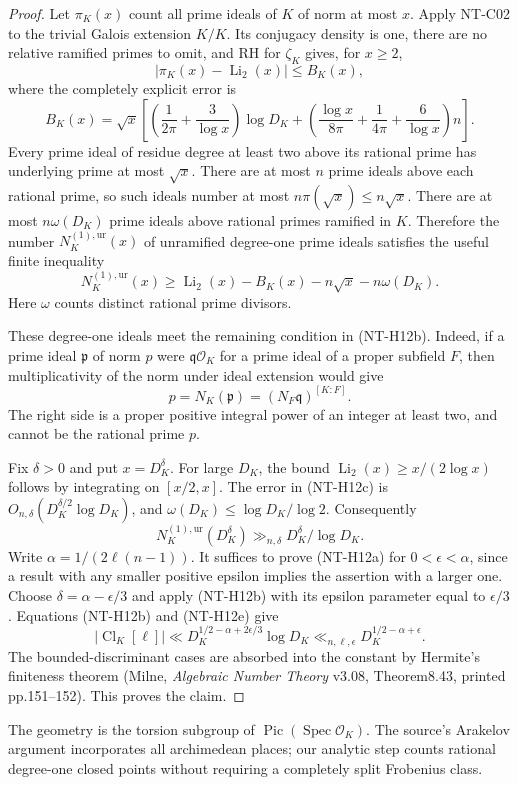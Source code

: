 \begin{proof}
Let $\pi_K(x)$ count all prime ideals of $K$ of norm at most $x$.
Apply NT-C02 to the trivial Galois extension $K/K$. Its conjugacy density
is one, there are no relative ramified primes to omit, and RH for
$\zeta_K$ gives, for $x\ge2$,
\[
 |\pi_K(x)-\operatorname{Li}_2(x)|\le B_K(x),
\]
where the completely explicit error is
\[
 B_K(x)=\sqrt x\left[
 \left(\frac1{2\pi}+\frac3{\log x}\right)\log D_K+
 \left(\frac{\log x}{8\pi}+\frac1{4\pi}+\frac6{\log x}\right)n
                  \right].                            \tag{NT-H12c}
\]
Every prime ideal of residue degree at least two above its rational
prime has underlying prime at most $\sqrt x$. There are at most $n$
prime ideals above each rational prime, so such ideals number at most
$n\pi(\sqrt x)\le n\sqrt x$. There are at most $n\omega(D_K)$
prime ideals above rational primes ramified in $K$. Therefore the
number $N_K^{(1),\mathrm{ur}}(x)$ of unramified degree-one prime ideals
satisfies the useful finite inequality
\[
 N_K^{(1),\mathrm{ur}}(x)
   \ge\operatorname{Li}_2(x)-B_K(x)-n\sqrt x-n\omega(D_K).
                                                        \tag{NT-H12d}
\]
Here $\omega$ counts distinct rational prime divisors.

These degree-one ideals meet the remaining condition in (NT-H12b).
Indeed, if a prime ideal $\mathfrak p$ of norm $p$ were
$\mathfrak q\mathcal O_K$ for a prime ideal of a proper subfield $F$,
then multiplicativity of the norm under ideal extension would give
\[
 p=N_K(\mathfrak p)=(N_F\mathfrak q)^{[K:F]}.
\]
The right side is a proper positive integral power of an integer
at least two, and cannot be the rational prime $p$.

Fix $\delta>0$ and put $x=D_K^\delta$. For large $D_K$, the bound
$\operatorname{Li}_2(x)\ge x/(2\log x)$ follows by integrating on
$[x/2,x]$. The error in (NT-H12c) is
$O_{n,\delta}(D_K^{\delta/2}\log D_K)$, and
$\omega(D_K)\le\log D_K/\log2$. Consequently
\[
 N_K^{(1),\mathrm{ur}}(D_K^\delta)
                  \gg_{n,\delta}D_K^\delta/\log D_K.   \tag{NT-H12e}
\]
Write $\alpha=1/(2\ell(n-1))$. It suffices to prove (NT-H12a) for
$0<\epsilon<\alpha$, since a result with any smaller positive epsilon
implies the assertion with a larger one. Choose
$\delta=\alpha-\epsilon/3$ and apply (NT-H12b) with its epsilon
parameter equal to $\epsilon/3$. Equations (NT-H12b) and (NT-H12e)
give
\[
 |\operatorname{Cl}_K[\ell]|
   \ll D_K^{1/2-\alpha+2\epsilon/3}\log D_K
   \ll_{n,\ell,\epsilon}D_K^{1/2-\alpha+\epsilon}.
\]
The bounded-discriminant cases are absorbed into the constant by
Hermite's finiteness theorem (Milne, \emph{Algebraic Number Theory}
v3.08, Theorem8.43, printed pp.151--152). This proves the claim.
\end{proof}
The geometry is the torsion subgroup of
$\operatorname{Pic}(\operatorname{Spec}\mathcal O_K)$.
The source's Arakelov argument incorporates all archimedean places;
our analytic step counts rational degree-one closed points without
requiring a completely split Frobenius class.

